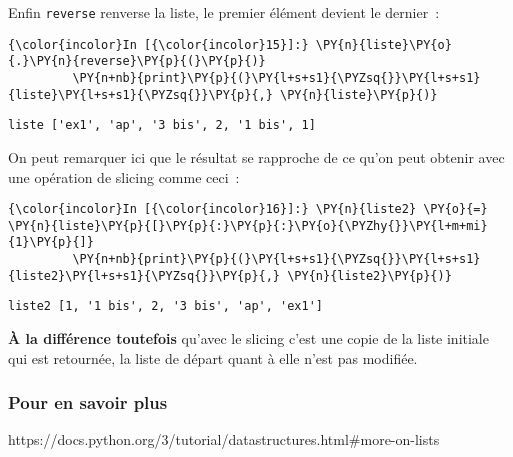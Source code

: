     Enfin \texttt{reverse} renverse la liste, le premier élément devient le
dernier~:

    \begin{Verbatim}[commandchars=\\\{\},frame=single,framerule=0.3mm,rulecolor=\color{cellframecolor}]
{\color{incolor}In [{\color{incolor}15}]:} \PY{n}{liste}\PY{o}{.}\PY{n}{reverse}\PY{p}{(}\PY{p}{)}
         \PY{n+nb}{print}\PY{p}{(}\PY{l+s+s1}{\PYZsq{}}\PY{l+s+s1}{liste}\PY{l+s+s1}{\PYZsq{}}\PY{p}{,} \PY{n}{liste}\PY{p}{)}
\end{Verbatim}


    \begin{Verbatim}[commandchars=\\\{\},frame=single,framerule=0.3mm,rulecolor=\color{cellframecolor}]
liste ['ex1', 'ap', '3 bis', 2, '1 bis', 1]
\end{Verbatim}

    On peut remarquer ici que le résultat se rapproche de ce qu'on peut
obtenir avec une opération de slicing comme ceci~:

    \begin{Verbatim}[commandchars=\\\{\},frame=single,framerule=0.3mm,rulecolor=\color{cellframecolor}]
{\color{incolor}In [{\color{incolor}16}]:} \PY{n}{liste2} \PY{o}{=} \PY{n}{liste}\PY{p}{[}\PY{p}{:}\PY{p}{:}\PY{o}{\PYZhy{}}\PY{l+m+mi}{1}\PY{p}{]}
         \PY{n+nb}{print}\PY{p}{(}\PY{l+s+s1}{\PYZsq{}}\PY{l+s+s1}{liste2}\PY{l+s+s1}{\PYZsq{}}\PY{p}{,} \PY{n}{liste2}\PY{p}{)}
\end{Verbatim}


    \begin{Verbatim}[commandchars=\\\{\},frame=single,framerule=0.3mm,rulecolor=\color{cellframecolor}]
liste2 [1, '1 bis', 2, '3 bis', 'ap', 'ex1']
\end{Verbatim}

    \textbf{À la différence toutefois} qu'avec le slicing c'est une copie de
la liste initiale qui est retournée, la liste de départ quant à elle
n'est pas modifiée.

    \hypertarget{pour-en-savoir-plus}{%
\subsubsection{Pour en savoir plus}\label{pour-en-savoir-plus}}

    https://docs.python.org/3/tutorial/datastructures.html\#more-on-lists

